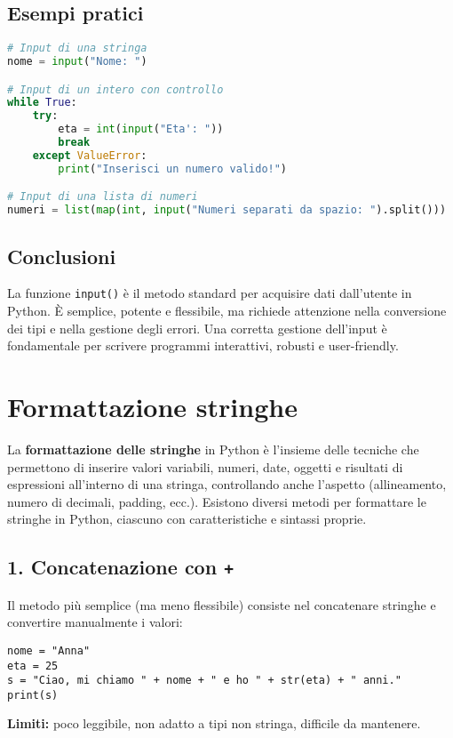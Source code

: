 \documentclass[a4paper,12pt]{article}
\begin{document}
\subsection*{Esempi pratici}
\begin{lstlisting}[language=Python, basicstyle=\ttfamily\footnotesize, breaklines=true, frame=single]
# Input di una stringa
nome = input("Nome: ")

# Input di un intero con controllo
while True:
    try:
        eta = int(input("Eta': "))
        break
    except ValueError:
        print("Inserisci un numero valido!")

# Input di una lista di numeri
numeri = list(map(int, input("Numeri separati da spazio: ").split()))
\end{lstlisting}

\subsection*{Conclusioni}
La funzione \texttt{input()} è il metodo standard per acquisire dati dall'utente in Python. È semplice, potente e flessibile, ma richiede attenzione nella conversione dei tipi e nella gestione degli errori. Una corretta gestione dell'input è fondamentale per scrivere programmi interattivi, robusti e user-friendly.

\section{Formattazione stringhe}
La \textbf{formattazione delle stringhe} in Python è l'insieme delle tecniche che permettono di inserire valori variabili, numeri, date, oggetti e risultati di espressioni all'interno di una stringa, controllando anche l'aspetto (allineamento, numero di decimali, padding, ecc.). Esistono diversi metodi per formattare le stringhe in Python, ciascuno con caratteristiche e sintassi proprie.

\subsection*{1. Concatenazione con \texttt{+}}
Il metodo più semplice (ma meno flessibile) consiste nel concatenare stringhe e convertire manualmente i valori:
\begin{lstlisting}
nome = "Anna"
eta = 25
s = "Ciao, mi chiamo " + nome + " e ho " + str(eta) + " anni."
print(s)
\end{lstlisting}
\textbf{Limiti:} poco leggibile, non adatto a tipi non stringa, difficile da mantenere.
\end{document}
